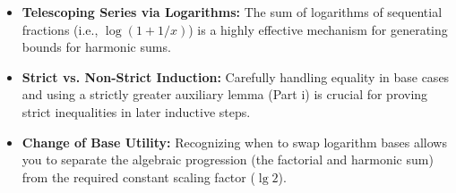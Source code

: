 \begin{takeaways}
\begin{itemize}
    \item \textbf{Telescoping Series via Logarithms:} The sum of logarithms of sequential fractions (i.e., $\log(1 + 1/x)$) is a highly effective mechanism for generating bounds for harmonic sums.
    \item \textbf{Strict vs. Non-Strict Induction:} Carefully handling equality in base cases and using a strictly greater auxiliary lemma (Part i) is crucial for proving strict inequalities in later inductive steps.
    \item \textbf{Change of Base Utility:} Recognizing when to swap logarithm bases allows you to separate the algebraic progression (the factorial and harmonic sum) from the required constant scaling factor ($\lg 2$).
\end{itemize}
\end{takeaways}
